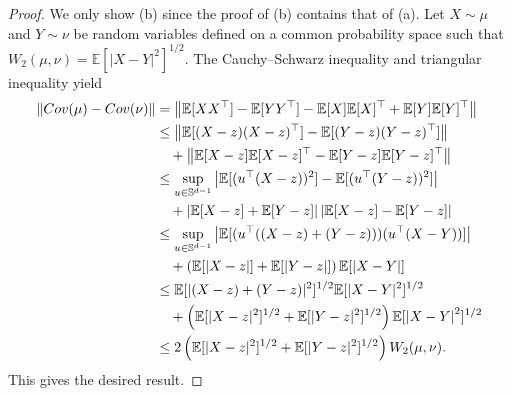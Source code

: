 \documentclass[10pt,a4paper]{amsart}
\newcommand{\Cov}{\textnormal{Cov}}
\newcommand{\E}{\mathbb{E}}
\newcommand{\bbS}{\mathbb{S}}
\begin{document}
\begin{proof}
    We only show (b) since the proof of (b) contains that of (a).
    Let $X\sim\mu$ and $Y\sim\nu$ be random variables defined on a common probability space such that $W_{2}(\mu,\nu)=\E[|X-Y|^{2}]^{1/2}$.
    The Cauchy--Schwarz inequality and triangular inequality yield
    \begin{align*}
        \|\Cov(\mu)-\Cov(\nu)\|&=\left\|\E[XX^{\top}]-\E[YY^{\top}]-\E[X]\E[X]^{\top}+\E[Y]\E[Y]^{\top}\right\|\\
        &\le \left\|\E[(X-z)(X-z)^{\top}]-\E[(Y-z)(Y-z)^{\top}]\right\|\\
        &\quad+\left\|\E[X-z]\E[X-z]^{\top}-\E[Y-z]\E[Y-z]^{\top}\right\|\\
        &\le \sup_{u\in\bbS^{d-1}}\left|\E[(u^{\top}(X-z))^{2}]-\E[(u^{\top}(Y-z))^{2}]\right|\\
        &\quad+\left|\E[X-z]+\E[Y-z]\right|\left|\E[X-z]-\E[Y-z]\right|\\
        &\le \sup_{u\in\bbS^{d-1}}\left|\E[(u^{\top}((X-z)+(Y-z)))(u^{\top}(X-Y))]\right|\\
        &\quad+\left(\E[|X-z|]+\E[|Y-z|]\right)\E[\left|X-Y\right|]\\
        &\le \E[|(X-z)+(Y-z)|^{2}]^{1/2}\E[|X-Y|^{2}]^{1/2}\\
        &\quad+\left(\E[|X-z|^{2}]^{1/2}+\E[|Y-z|^{2}]^{1/2}\right)\E[\left|X-Y\right|^{2}]^{1/2}\\
        &\le 2\left(\E[|X-z|^{2}]^{1/2}+\E[|Y-z|^{2}]^{1/2}\right)W_{2}(\mu,\nu).
    \end{align*}
    This gives the desired result.
\end{proof}
\end{document}
